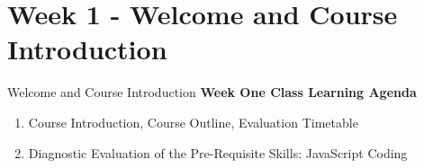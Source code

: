 \section{Week 1 - Welcome and Course Introduction}
\begin{frame}{Welcome and Course Introduction}
\textbf{Week One Class Learning Agenda}
\begin{enumerate}
    \item Course Introduction, Course Outline, Evaluation Timetable
    \item Diagnostic Evaluation of the Pre-Requisite Skills: JavaScript Coding
\end{enumerate}
\end{frame}


